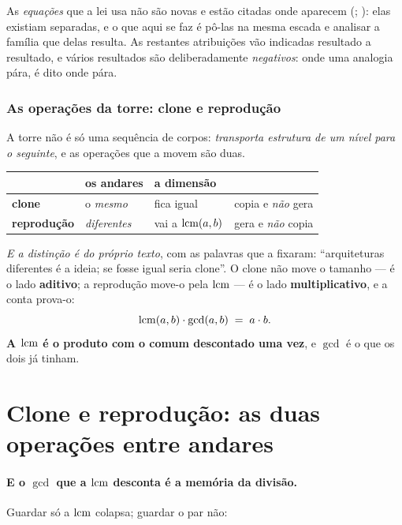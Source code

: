 \documentclass[livro.tex]{subfiles}
\begin{document}
\smallskip
\noindent As \emph{equações} que a lei usa não são novas e estão citadas onde aparecem
(\cite{cook2021}; \cite{wonenburger1966,djokovic1967}): elas existiam separadas, e o que aqui se faz
é pô-las na mesma escada e analisar a família que delas resulta. As restantes atribuições vão
indicadas resultado a resultado, e vários resultados são deliberadamente \emph{negativos}: onde uma
analogia pára, é dito onde pára.
\subsubsection*{As operações da torre: clone e reprodução}

A torre não é só uma sequência de corpos: \emph{transporta estrutura de um nível para o
seguinte}, e as operações que a movem são duas.

\begin{center}\small
\begin{tabular}{@{}llll@{}}
\toprule
 & \textbf{os andares} & \textbf{a dimensão} & \\
\midrule
\textbf{clone}      & o \emph{mesmo}   & fica igual        & copia e \emph{não} gera \\
\textbf{reprodução} & \emph{diferentes} & vai a $\operatorname{lcm}(a,b)$ & gera e \emph{não} copia \\
\bottomrule
\end{tabular}
\end{center}

\noindent \emph{E a distinção é do próprio texto}, com as palavras que a fixaram: ``arquiteturas
diferentes é a ideia; se fosse igual seria clone''. O clone não move o tamanho --- é o lado
\textbf{aditivo}; a reprodução move-o pela $\operatorname{lcm}$ --- é o lado \textbf{multiplicativo}, e a conta
prova-o:
\[
  \operatorname{lcm}(a,b)\cdot\gcd(a,b) \;=\; a\cdot b .
\]
\textbf{A $\operatorname{lcm}$ é o produto com o comum descontado uma vez}, e $\gcd$ é o que os dois já tinham.


\section{Clone e reprodução: as duas operações entre andares}\label{sec:clonerep}

\paragraph{E o $\gcd$ que a $\operatorname{lcm}$ desconta é a memória da divisão.} Guardar só a $\operatorname{lcm}$ colapsa;
guardar o par não:
\end{document}
